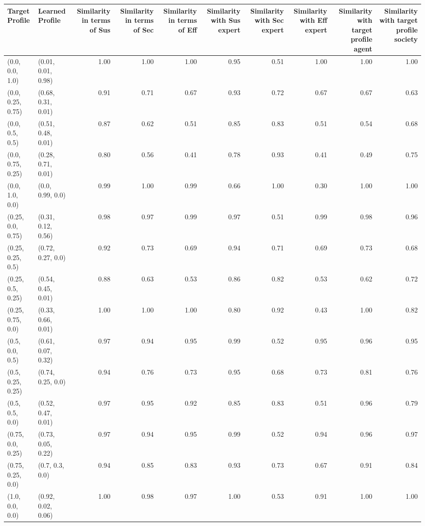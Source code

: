 \begin{tabular}{llrrrrrrrr}
\toprule
Target Profile & Learned Profile & Similarity in terms of Sus & Similarity in terms of Sec & Similarity in terms of Eff & Similarity with Sus expert & Similarity with Sec expert & Similarity with Eff expert & Similarity with target profile agent & Similarity with target profile society \\
\midrule
(0.0, 0.0, 1.0) & (0.01, 0.01, 0.98) & 1.00 & 1.00 & 1.00 & 0.95 & 0.51 & 1.00 & 1.00 & 1.00 \\
(0.0, 0.25, 0.75) & (0.68, 0.31, 0.01) & 0.91 & 0.71 & 0.67 & 0.93 & 0.72 & 0.67 & 0.67 & 0.63 \\
(0.0, 0.5, 0.5) & (0.51, 0.48, 0.01) & 0.87 & 0.62 & 0.51 & 0.85 & 0.83 & 0.51 & 0.54 & 0.68 \\
(0.0, 0.75, 0.25) & (0.28, 0.71, 0.01) & 0.80 & 0.56 & 0.41 & 0.78 & 0.93 & 0.41 & 0.49 & 0.75 \\
(0.0, 1.0, 0.0) & (0.0, 0.99, 0.0) & 0.99 & 1.00 & 0.99 & 0.66 & 1.00 & 0.30 & 1.00 & 1.00 \\
(0.25, 0.0, 0.75) & (0.31, 0.12, 0.56) & 0.98 & 0.97 & 0.99 & 0.97 & 0.51 & 0.99 & 0.98 & 0.96 \\
(0.25, 0.25, 0.5) & (0.72, 0.27, 0.0) & 0.92 & 0.73 & 0.69 & 0.94 & 0.71 & 0.69 & 0.73 & 0.68 \\
(0.25, 0.5, 0.25) & (0.54, 0.45, 0.01) & 0.88 & 0.63 & 0.53 & 0.86 & 0.82 & 0.53 & 0.62 & 0.72 \\
(0.25, 0.75, 0.0) & (0.33, 0.66, 0.01) & 1.00 & 1.00 & 1.00 & 0.80 & 0.92 & 0.43 & 1.00 & 0.82 \\
(0.5, 0.0, 0.5) & (0.61, 0.07, 0.32) & 0.97 & 0.94 & 0.95 & 0.99 & 0.52 & 0.95 & 0.96 & 0.95 \\
(0.5, 0.25, 0.25) & (0.74, 0.25, 0.0) & 0.94 & 0.76 & 0.73 & 0.95 & 0.68 & 0.73 & 0.81 & 0.76 \\
(0.5, 0.5, 0.0) & (0.52, 0.47, 0.01) & 0.97 & 0.95 & 0.92 & 0.85 & 0.83 & 0.51 & 0.96 & 0.79 \\
(0.75, 0.0, 0.25) & (0.73, 0.05, 0.22) & 0.97 & 0.94 & 0.95 & 0.99 & 0.52 & 0.94 & 0.96 & 0.97 \\
(0.75, 0.25, 0.0) & (0.7, 0.3, 0.0) & 0.94 & 0.85 & 0.83 & 0.93 & 0.73 & 0.67 & 0.91 & 0.84 \\
(1.0, 0.0, 0.0) & (0.92, 0.02, 0.06) & 1.00 & 0.98 & 0.97 & 1.00 & 0.53 & 0.91 & 1.00 & 1.00 \\
\bottomrule
\end{tabular}
